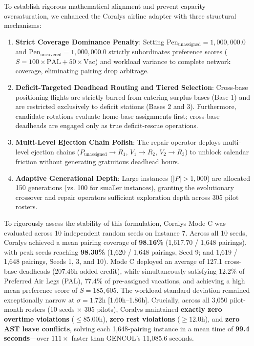 \documentclass[journal]{IEEEtran}
\begin{document}
To establish rigorous mathematical alignment and prevent capacity oversaturation, we enhanced the Coralys airline adapter with three structural mechanisms:
\begin{enumerate}
    \item \textbf{Strict Coverage Dominance Penalty}: Setting $\text{Pen}_{\text{unassigned}} = 1,000,000.0$ and $\text{Pen}_{\text{uncovered}} = 1,000,000.0$ strictly subordinates preference scores ($S = 100 \times \text{PAL} + 50 \times \text{Vac}$) and workload variance to complete network coverage, eliminating pairing drop arbitrage.
    \item \textbf{Deficit-Targeted Deadhead Routing and Tiered Selection}: Cross-base positioning flights are strictly barred from entering surplus bases (Base 1) and are restricted exclusively to deficit stations (Bases 2 and 3). Furthermore, candidate rotations evaluate home-base assignments first; cross-base deadheads are engaged only as true deficit-rescue operations.
    \item \textbf{Multi-Level Ejection Chain Polish}: The repair operator deploys multi-level ejection chains ($P_{\text{unassigned}} \to R_1$, $V_1 \to R_2$, $V_2 \to R_3$) to unblock calendar friction without generating gratuitous deadhead hours.
    \item \textbf{Adaptive Generational Depth}: Large instances ($|P| > 1,000$) are allocated 150 generations (vs. 100 for smaller instances), granting the evolutionary crossover and repair operators sufficient exploration depth across 305 pilot rosters.
\end{enumerate}

To rigorously assess the stability of this formulation, Coralys Mode C was evaluated across 10 independent random seeds on Instance 7. Across all 10 seeds, Coralys achieved a mean pairing coverage of \textbf{98.16\%} (1,617.70 / 1,648 pairings), with peak seeds reaching \textbf{98.30\%} (1,620 / 1,648 pairings, Seed 9; and 1,619 / 1,648 pairings, Seeds 1, 3, and 10). Mode C deployed an average of 127.1 cross-base deadheads (207.46h added credit), while simultaneously satisfying 12.2\% of Preferred Air Legs (PAL), 77.4\% of pre-assigned vacations, and achieving a high mean preference score of $S = 185,605$. The workload standard deviation remained exceptionally narrow at $\sigma = 1.72$h [1.60h--1.86h]. Crucially, across all 3,050 pilot-month rosters (10 seeds $\times$ 305 pilots), Coralys maintained \textbf{exactly zero overtime violations} ($\le 85.00$h), \textbf{zero rest violations} ($\ge 12.0$h), and \textbf{zero AST leave conflicts}, solving each 1,648-pairing instance in a mean time of \textbf{99.4 seconds}---over $111\times$ faster than GENCOL's 11,085.6 seconds.
\end{document}
